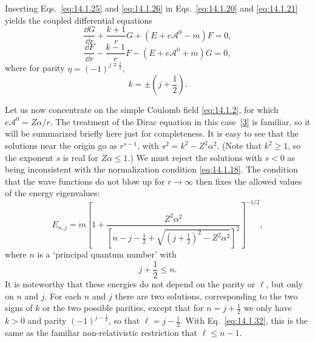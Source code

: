 Inserting Eqs.~\eqref{eq:14.1.25} and \eqref{eq:14.1.26} in
Eqs.~\eqref{eq:14.1.20} and \eqref{eq:14.1.21} yields the coupled differential
equations
\begin{equation}
  \frac{\dd G}{\dd r}+\frac{k+1}{r}G+(E+e\mathcal A^0-m)F=0,
  \tag{14.1.28}\label{eq:14.1.28}
\end{equation}
\begin{equation}
  \frac{\dd F}{\dd r}-\frac{k-1}{r}F-(E+e\mathcal A^0+m)G=0,
  \tag{14.1.29}\label{eq:14.1.29}
\end{equation}
where for parity $\eta=(-1)^{j\mp\frac12}$,
\begin{equation}
  k=\pm\left(j+\frac12\right).
  \tag{14.1.30}\label{eq:14.1.30}
\end{equation}

Let us now concentrate on the simple Coulomb field \eqref{eq:14.1.2}, for which
$e\mathcal A^0=Z\alpha/r$. The treatment of the Dirac equation in this
case~\hyperlink{ref:14.3}{[3]} is familiar, so it will be summarized briefly
here just for completeness. It is easy to see that the solutions near the
origin go as $r^{s-1}$, with $s^2=k^2-Z^2\alpha^2$. (Note that $k^2\geq1$, so
the exponent $s$ is real for $Z\alpha\leq1$.) We must reject the solutions with
$s<0$ as being inconsistent with the normalization condition
\eqref{eq:14.1.18}. The condition that the wave functions do not blow up for
$r\to\infty$ then fixes the allowed values of the energy eigenvalues:
\begin{equation}
 E_{n,j}=m\left[1+
 \frac{Z^2\alpha^2}{\left[n-j-\frac12+
 \sqrt{(j+\frac12)^2-Z^2\alpha^2}\right]^2}\right]^{-1/2},
 \tag{14.1.31}\label{eq:14.1.31}
\end{equation}
where $n$ is a `principal quantum number' with
\begin{equation}
  j+\frac12\leq n.
  \tag{14.1.32}\label{eq:14.1.32}
\end{equation}
It is noteworthy that these energies do not depend on the parity or $\ell$,
but only on $n$ and $j$. For each $n$ and $j$ there are two solutions,
corresponding to the two signs of $k$ or the two possible parities, except that
for $n=j+\frac12$ we only have $k>0$ and parity $(-1)^{j-\frac12}$, so that
$\ell=j-\frac12$. With Eq.~\eqref{eq:14.1.32}, this is the same as the familiar
non-relativistic restriction that $\ell\leq n-1$.

